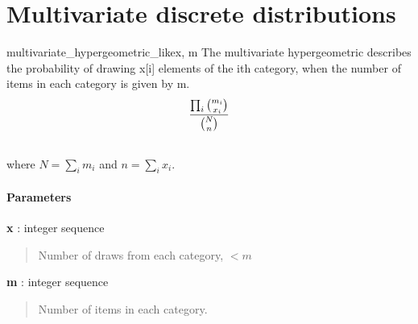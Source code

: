\section{Multivariate discrete distributions}

\hypertarget{pymc.distributions.multivariate_hypergeometric_like}{}
\begin{funcdesc}{multivariate\_hypergeometric\_like}{x, m}
The multivariate hypergeometric describes the probability of drawing x{[}i{]}
elements of the ith category, when the number of items in each category is
given by m.
\begin{gather}
\begin{split}\frac{\prod_i \binom{m_i}{x_i}}{\binom{N}{n}}\end{split}\notag\\\begin{split}\end{split}\notag
\end{gather}
where $N = \sum_i m_i$ and $n = \sum_i x_i$.
\paragraph{Parameters}\begin{paramlist}

\item[] \textbf{x} : integer sequence
\begin{quote}

Number of draws from each category, $< m$
\end{quote}

\item[] \textbf{m} : integer sequence
\begin{quote}

Number of items in each category.
\end{quote}
\end{paramlist}
\end{funcdesc}

